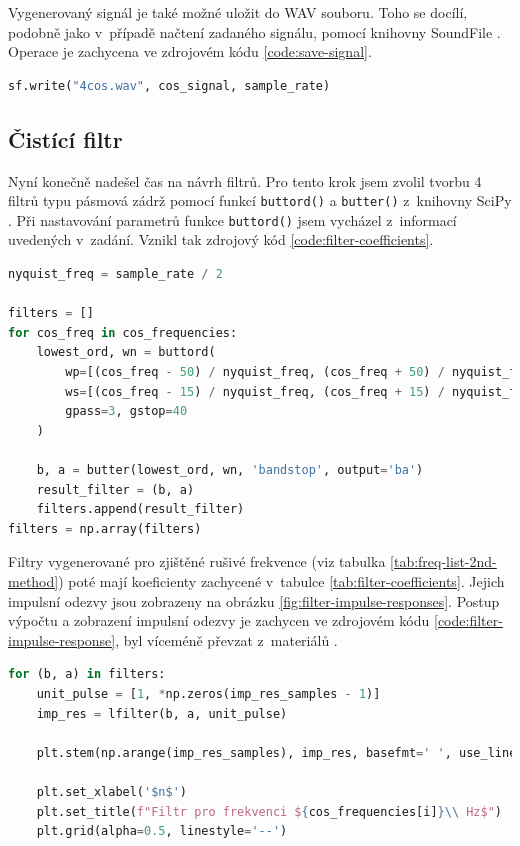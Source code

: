 \documentclass[a4paper, 11pt, final]{article}
\begin{document}
Vygenerovaný signál je také možné uložit do WAV souboru. Toho se docílí, podobně jako v~případě načtení zadaného signálu, pomocí knihovny SoundFile \cite{soundfile-reference}. Operace je zachycena ve zdrojovém kódu \ref{code:save-signal}.

\begin{lstlisting}[language=Python, caption=Uložení signálu do WAV souboru, label={code:save-signal}]
sf.write("4cos.wav", cos_signal, sample_rate)
\end{lstlisting}

\subsection{Čistící filtr}

Nyní konečně nadešel čas na návrh filtrů. Pro tento krok jsem zvolil tvorbu 4 filtrů typu pásmová zádrž pomocí funkcí \texttt{buttord()} a \texttt{butter()} z~knihovny SciPy \cite{scipy-reference}. Při nastavování parametrů funkce \texttt{buttord()} jsem vycházel z~informací uvedených v~zadání. Vznikl tak zdrojový kód \ref{code:filter-coefficients}.

\begin{lstlisting}[language=Python, caption=Získání koeficientů filtrů, label={code:filter-coefficients}]
nyquist_freq = sample_rate / 2

filters = []
for cos_freq in cos_frequencies:
    lowest_ord, wn = buttord(
        wp=[(cos_freq - 50) / nyquist_freq, (cos_freq + 50) / nyquist_freq],
        ws=[(cos_freq - 15) / nyquist_freq, (cos_freq + 15) / nyquist_freq],
        gpass=3, gstop=40
    )

    b, a = butter(lowest_ord, wn, 'bandstop', output='ba')
    result_filter = (b, a)
    filters.append(result_filter)
filters = np.array(filters)
\end{lstlisting}

Filtry vygenerované pro zjištěné rušivé frekvence (viz tabulka \ref{tab:freq-list-2nd-method}) poté mají koeficienty zachycené v~tabulce \ref{tab:filter-coefficients}. Jejich impulsní odezvy jsou zobrazeny na obrázku \ref{fig:filter-impulse-responses}. Postup výpočtu a zobrazení impulsní odezvy je zachycen ve zdrojovém kódu \ref{code:filter-impulse-response}, byl víceméně převzat z~materiálů \cite{zmolikova-demo}.

\begin{lstlisting}[language=Python, caption=Výpočet a zobrazení impulsní odezvy filtrů, label={code:filter-impulse-response}]
for (b, a) in filters:
    unit_pulse = [1, *np.zeros(imp_res_samples - 1)]
    imp_res = lfilter(b, a, unit_pulse)

    plt.stem(np.arange(imp_res_samples), imp_res, basefmt=' ', use_line_collection=True)

    plt.set_xlabel('$n$')
    plt.set_title(f"Filtr pro frekvenci ${cos_frequencies[i]}\\ Hz$")
    plt.grid(alpha=0.5, linestyle='--')
\end{lstlisting}
\end{document}

